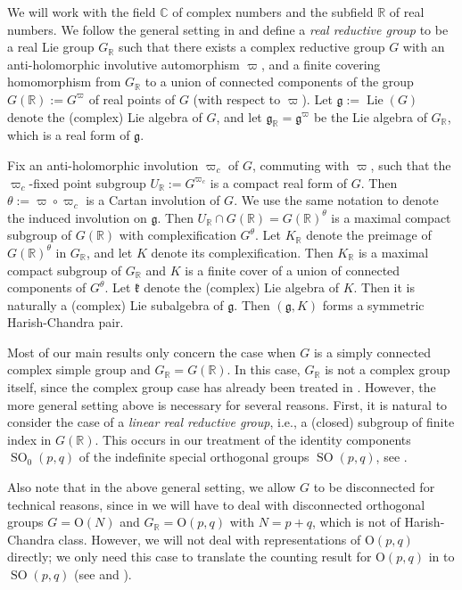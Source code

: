 \documentclass[11pt, a4paper]{amsart}
\newcommand{\C}{\mathbb{C}}
\newcommand{\g}{\mathfrak{g}}
\newcommand{\fk}{\mathfrak{k}}
\DeclareMathOperator{\Lie}{Lie}
\newcommand{\SO}{\operatorname{SO}}
\newcommand{\R}{\mathbb{R}}
\newcommand{\GR}{G_\R}
\newcommand{\KR}{K_\R}
\theoremstyle{definition}
\numberwithin{equation}{section}
\begin{document}
We will work with the field $\C$ of complex numbers and the subfield $\R$ of real numbers. We follow the general setting in \cite[Section 8.1]{DavisVilonen:unitary} and define a {\it real reductive group} to be a real Lie group $\GR$ such that there exists a complex reductive group $G$ with an anti-holomorphic involutive automorphism $\varpi$, and a finite covering homomorphism from $\GR$ to a union of connected components of the group $G(\R):=G^\varpi$ of real points of $G$ (with respect to $\varpi$). Let $\g := \Lie(G)$ denote the (complex) Lie algebra of $G$, and let $\g_\R = \g^{\varpi}$ be the Lie algebra of $\GR$, which is a real form of $\g$.

Fix an anti-holomorphic involution $\varpi_c$ of $G$, commuting with $\varpi$, such that the $\varpi_c$-fixed point subgroup $U_{\R} := G^{\varpi_c}$ is a compact real form of $G$.
Then $\theta:=\varpi \circ \varpi_c$ is a Cartan involution of $G$. We use the same notation to denote the induced involution on $\g$. Then $U_\R \cap G(\R) = G(\R)^\theta$ is a maximal compact subgroup of $G(\R)$ with complexification $G^\theta$. Let $\KR$ denote the preimage of $G(\R)^\theta$ in $\GR$, and let $K$ denote its complexification. Then $\KR$ is a maximal compact subgroup of $\GR$ and $K$ is a finite cover of a union of connected components of $G^\theta$. Let $\fk$ denote the (complex) Lie algebra of $K$. Then it is naturally a (complex) Lie subalgebra of $\g$. Then $(\g,K)$ forms a symmetric Harish-Chandra pair. 

Most of our main results only concern the case when $G$ is a simply connected complex simple group and $\GR = G(\R)$. In this case, $\GR$ is not a complex group itself, since the complex group case has already been treated in \cite{DMB-Hodge}.
However, the more general setting above is necessary for several reasons. First, it is natural to consider the case of a {\it linear real reductive group}, i.e., a (closed) subgroup of finite index in $G(\R)$. This occurs in our treatment of the identity components $\SO_0(p,q)$ of the indefinite special orthogonal groups $\SO(p,q)$, see . 

Also note that in the above general setting, we allow $G$ to be disconnected for technical reasons, since in  we will have to deal with disconnected orthogonal groups $G = \mathrm{O}(N)$ and $\GR = \mathrm{O}(p,q)$ with $N=p+q$, which is not of Harish-Chandra class. However, we will not deal with representations of $\mathrm{O}(p,q)$ directly; we only need this case to translate the counting result for $\mathrm{O}(p,q)$ in \cite[Proposition 4.11]{BMSZ:construction_unitarity} to $\SO(p,q)$ (see  and ). 
\end{document}
